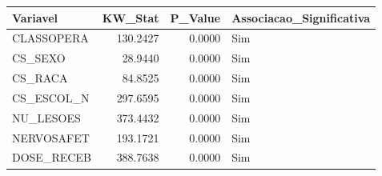 \begin{tabular}{lrrl}
\toprule
Variavel & KW\_Stat & P\_Value & Associacao\_Significativa \\
\midrule
CLASSOPERA & 130.2427 & 0.0000 & Sim \\
CS\_SEXO & 28.9440 & 0.0000 & Sim \\
CS\_RACA & 84.8525 & 0.0000 & Sim \\
CS\_ESCOL\_N & 297.6595 & 0.0000 & Sim \\
NU\_LESOES & 373.4432 & 0.0000 & Sim \\
NERVOSAFET & 193.1721 & 0.0000 & Sim \\
DOSE\_RECEB & 388.7638 & 0.0000 & Sim \\
\bottomrule
\end{tabular}
